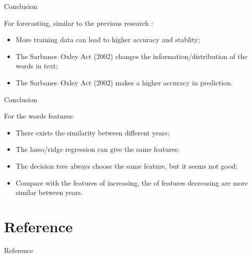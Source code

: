 \documentclass{beamer}
\begin{document}
\begin{frame}{Conclusion}

  For forecasting, similar to the previous research :

  \begin{itemize}
    \item More training data can lead to higher accuracy and stablity; \vspace{.25cm}
    \item The Sarbanes–Oxley Act (2002) changes the information/distribution of the words in text; \vspace{.25cm}
    \item The Sarbanes–Oxley Act (2002) makes a higher accuracy in prediction.
  \end{itemize}

\end{frame}

\begin{frame}{Conclusion}

  For the words features: \vspace{.25cm}

  \begin{itemize}
    \item There exists the similarity between different years; \vspace{.25cm}
    \item The lasso/ridge regression can give the same features; \vspace{.25cm}
    \item The decision tree always choose the same feature, but it seems not good; \vspace{.25cm}
    \item Compare with the features of increasing, the of features decreasing are more similar between years.
  \end{itemize}

\end{frame}

\section*{Reference}
\begin{frame}[allowframebreaks]{Reference}
  \printbibliography
\end{frame}

\appendix
\end{document}
